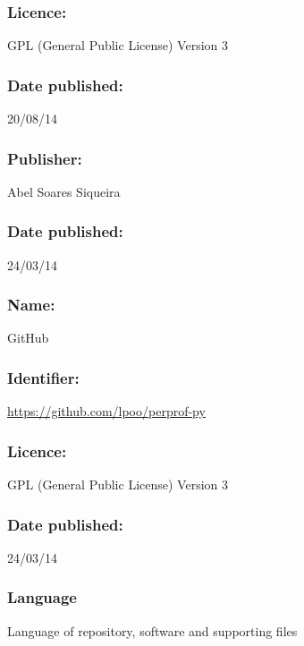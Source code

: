     \subsubsection*{Licence:} GPL (General Public License) Version 3

    \subsubsection*{Date published:} 20/08/14

    \subsubsection*{Publisher:} Abel Soares Siqueira

    \subsubsection*{Date published:} 24/03/14

\CodeRepository

    \subsubsection*{Name:} GitHub

    \subsubsection*{Identifier:} \url{https://github.com/lpoo/perprof-py}

    \subsubsection*{Licence:} GPL (General Public License) Version 3

    \subsubsection*{Date published:} 24/03/14

\subsubsection*{Language}

    Language of repository, software and supporting files

